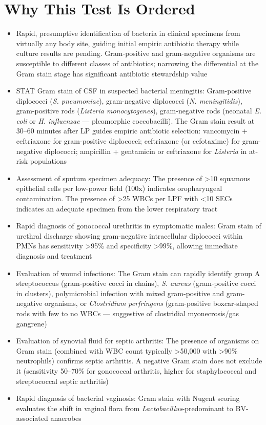 \section*{Why This Test Is Ordered}
\begin{itemize}
  \item Rapid, presumptive identification of bacteria in clinical specimens from virtually any body site, guiding initial empiric antibiotic therapy while culture results are pending. Gram-positive and gram-negative organisms are susceptible to different classes of antibiotics; narrowing the differential at the Gram stain stage has significant antibiotic stewardship value
  \item STAT Gram stain of CSF in suspected bacterial meningitis: Gram-positive diplococci (\textit{S. pneumoniae}), gram-negative diplococci (\textit{N. meningitidis}), gram-positive rods (\textit{Listeria monocytogenes}), gram-negative rods (neonatal \textit{E. coli} or \textit{H. influenzae} --- pleomorphic coccobacilli). The Gram stain result at 30--60 minutes after LP guides empiric antibiotic selection: vancomycin + ceftriaxone for gram-positive diplococci; ceftriaxone (or cefotaxime) for gram-negative diplococci; ampicillin + gentamicin or ceftriaxone for \textit{Listeria} in at-risk populations
  \item Assessment of sputum specimen adequacy: The presence of >10 squamous epithelial cells per low-power field (100x) indicates oropharyngeal contamination. The presence of >25 WBCs per LPF with <10 SECs indicates an adequate specimen from the lower respiratory tract
  \item Rapid diagnosis of gonococcal urethritis in symptomatic males: Gram stain of urethral discharge showing gram-negative intracellular diplococci within PMNs has sensitivity >95\% and specificity >99\%, allowing immediate diagnosis and treatment
  \item Evaluation of wound infections: The Gram stain can rapidly identify group A streptococcus (gram-positive cocci in chains), \textit{S. aureus} (gram-positive cocci in clusters), polymicrobial infection with mixed gram-positive and gram-negative organisms, or \textit{Clostridium perfringens} (gram-positive boxcar-shaped rods with few to no WBCs --- suggestive of clostridial myonecrosis/gas gangrene)
  \item Evaluation of synovial fluid for septic arthritis: The presence of organisms on Gram stain (combined with WBC count typically >50,000 with >90\% neutrophils) confirms septic arthritis. A negative Gram stain does not exclude it (sensitivity 50--70\% for gonococcal arthritis, higher for staphylococcal and streptococcal septic arthritis)
  \item Rapid diagnosis of bacterial vaginosis: Gram stain with Nugent scoring evaluates the shift in vaginal flora from \textit{Lactobacillus}-predominant to BV-associated anaerobes
\end{itemize}

